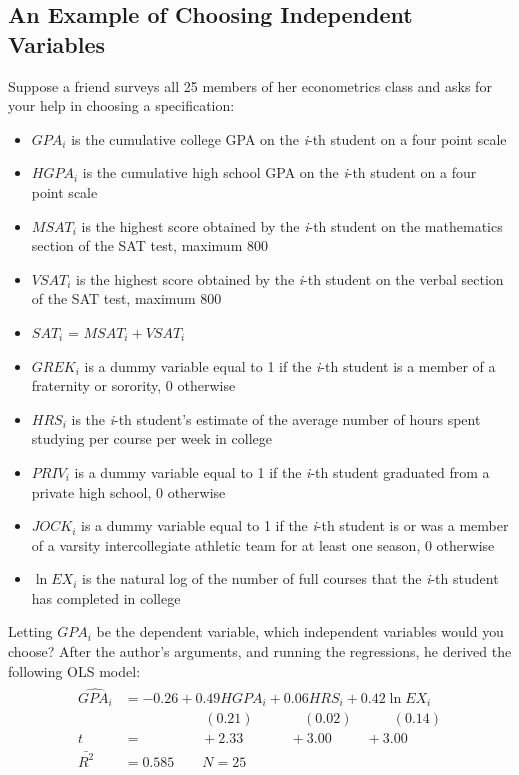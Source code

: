 \documentclass[11pt]{article}
\begin{document}
\subsection{An Example of Choosing Independent Variables}
Suppose a friend surveys all 25 members of her econometrics class and asks for your help in choosing a specification:
\begin{itemize}
\item $GPA_i$ is the cumulative college GPA on the \textit{i}-th student on a four point scale
\item $HGPA_i$ is the cumulative high school GPA on the \textit{i}-th student on a four point scale
\item $MSAT_i$ is the highest score obtained by the \textit{i}-th student on the mathematics section of the SAT test, maximum 800
\item $VSAT_i$ is the highest score obtained by the \textit{i}-th student on the verbal section of the SAT test, maximum 800
\item $SAT_i$ = $MSAT_i + VSAT_i$
\item $GREK_i$ is a dummy variable equal to 1 if the \textit{i}-th student is a member of a fraternity or sorority, 0 otherwise
\item $HRS_i$ is the \textit{i}-th student's estimate of the average number of hours spent studying per course per week in college
\item $PRIV_i$ is a dummy variable equal to 1 if the \textit{i}-th student graduated from a private high school, 0 otherwise
\item $JOCK_i$ is a dummy variable equal to 1 if the \textit{i}-th student is or was a member of a varsity intercollegiate athletic team for at least one season, 0 otherwise
\item $\ln EX_i$ is the natural log of the number of full courses that the \textit{i}-th student has completed in college
\end{itemize}
Letting $GPA_i$ be the dependent variable, which independent variables would you choose? After the author's arguments, and running the regressions, he derived the following OLS model:
\begin{align}
\label{eg6_18}
\begin{split}
\widehat{GPA_i} &= -0.26 + {0.49HGPA_i} + {0.06HRS_i} + {0.42\ln EX_i}\\
&\>\>\>\>\>\>\>\>\>\>\>\>\>\>\>\>\>\>\>\>\>\>\>\>\>\> (0.21) 
\>\>\>\>\>\>\>\>\>\>\>\>\>\>\>\> (0.02)
\>\>\>\>\>\>\>\>\>\>\>\>\> (0.14)\\
t&=\>\>\>\>\>\>\>\>\>\>\>\>\>\>\>\>\>\>\> +2.33 
\>\>\>\>\>\>\>\>\>\>\>\>\>\>\>+3.00
\>\>\>\>\>\>\>\>\>\>\> +3.00\\
\bar{R^2}&= 0.585 \quad\quad N=25
\end{split}
\end{align}
\end{document}
